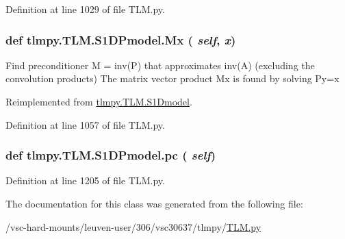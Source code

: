 Definition at line 1029 of file TLM.py.\hypertarget{classtlmpy_1_1TLM_1_1S1DPmodel_a8a3c8c4f7ed27896039af1f9779c1383}{
\subsubsection[{Mx}]{\setlength{\rightskip}{0pt plus 5cm}def tlmpy.TLM.S1DPmodel.Mx ( {\em self}, \/   {\em x})}}
\label{classtlmpy_1_1TLM_1_1S1DPmodel_a8a3c8c4f7ed27896039af1f9779c1383}
\begin{DoxyVerb}
Find preconditioner M = inv(P) that approximates inv(A)
(excluding the convolution products)
The matrix vector product Mx is found by solving Py=x
\end{DoxyVerb}
 

Reimplemented from \hyperlink{classtlmpy_1_1TLM_1_1S1Dmodel_ac118c2a6c1b74be47a69631685b2f549}{tlmpy.TLM.S1Dmodel}.

Definition at line 1057 of file TLM.py.\hypertarget{classtlmpy_1_1TLM_1_1S1DPmodel_a611a7060427bfb44bb06995ebffbae06}{
\subsubsection[{pc}]{\setlength{\rightskip}{0pt plus 5cm}def tlmpy.TLM.S1DPmodel.pc ( {\em self})}}
\label{classtlmpy_1_1TLM_1_1S1DPmodel_a611a7060427bfb44bb06995ebffbae06}


Definition at line 1205 of file TLM.py.

The documentation for this class was generated from the following file:\begin{DoxyCompactItemize}
\item 
/vsc-\/hard-\/mounts/leuven-\/user/306/vsc30637/tlmpy/\hyperlink{TLM_8py}{TLM.py}\end{DoxyCompactItemize}
